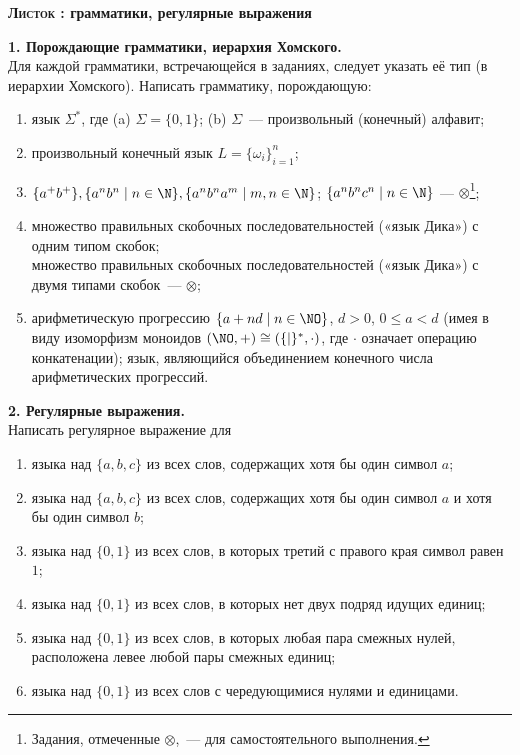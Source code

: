 \newcommand{\Sig}{\ensuremath{\Sigma}}

\begin{center}
{\bfseries\Large \textsc{Листок \Lnum :}  грамматики,
регулярные выражения}
\end{center}

\textbf{1. Порождающие грамматики, иерархия Хомского.}\\
Для каждой грамматики, встречающейся в заданиях, следует указать её тип (в
иерархии Хомского). Написать грамматику, порождающую:
\begin{enumerate}
 \item язык $\Sig^{\ast}$, где (a) $\Sig = \{0, 1\}$; (b) \Sig{}~— произвольный
 (конечный) алфавит;
 
 \item произвольный конечный язык $L = \{\omega_i\}^n_{i=1}$;
 
 \item $\{a^{+}b^{+}\}, \{a^nb^n \mid n \in \N\}, \{a^nb^na^m \mid m, n \in
     \N\}$; $\{ a^nb^nc^n \mid n \in \N \}$ — ${\otimes}$\footnote{ Задания,
     отмеченные ${\otimes}$,~— для самостоятельного выполнения.};
 
 \item множество правильных скобочных последовательностей («язык Дика») с
     одним типом скобок;\\
     множество правильных скобочных последовательностей («язык Дика») с
     двумя типами скобок~— ${\otimes}$;
  \item арифметическую прогрессию $\{a + nd \mid n \in \NO\}$, $d > 0$, $0
    \leqslant a < d$ (имея в виду изоморфизм моноидов $(\NO, +) \cong
    (\{|\}^{\ast}, {\cdot})$, где ${\cdot}$ означает операцию конкатенации);
    язык, являющийся объединением конечного числа арифметических прогрессий.
\end{enumerate}
     
\textbf{2. Регулярные выражения.}\\
Написать регулярное выражение для
\begin{enumerate}
    \item языка над $\{a, b, c\}$ из всех слов, содержащих хотя бы один символ
    $a$;
    \item языка над $\{a, b, c\}$ из всех слов, содержащих хотя бы один символ
    $a$ и хотя бы один символ $b$;
    \item языка над $\{0, 1\}$ из всех слов, в которых третий с правого края
    символ равен $1$;
    \item языка над $\{0, 1\}$ из всех слов, в которых нет двух подряд идущих единиц;
    \item языка над $\{0, 1\}$ из всех слов, в которых любая пара смежных нулей,  
     расположена левее любой пары смежных единиц;
    \item языка над $\{0, 1\}$ из всех слов с чередующимися нулями и единицами. 
\end{enumerate}
 